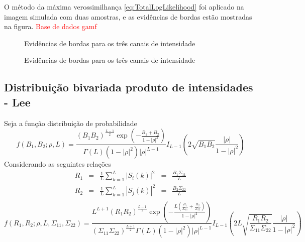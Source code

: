 O método da máxima verossimilhança \eqref{eq:TotalLogLikelihood} foi aplicado na imagem simulada com duas amostras, e as evidências de bordas estão mostradas na figura. \textcolor{red}{Base de dados gamf}
 \begin{figure*}[hbt]
	\centering
    \caption{Evidências de bordas para os três canais de intensidade}
     \label{evidencias_hh_hv_vv_gamf} 
   \end{figure*}
   
   \begin{figure*}[hbt]
	\centering
    \caption{Evidências de bordas para os três canais de intensidade}
     \label{evidencias_hh_hv_vv_gamf} 
   \end{figure*}   
   
   
\subsection{Distribuição bivariada produto de intensidades - Lee } 

Seja a função distribuição de probabilidade 
\begin{equation}\label{func_biv_produto_inten_b1_b2}
	f(B_1,B_2;\rho, L)=\frac{\left(B_1B_2\right)^{\frac{L-1}{2}}\exp\left(-\frac{B_1+B_2}{1-|\rho|^2}\right)}{\Gamma(L)(1-|\rho|^2)|\rho|^{L-1}}I_{L-1}\left(2\sqrt{B_1B_2}\frac{|\rho|}{1-|\rho|^2}\right)
\end{equation}
Considerando as seguintes relações 
\begin{equation}\label{eqn59}
\begin{array}{ccccc}
	R_1&=&\frac{1}{L}\sum_{k=1}^{L}|S_i(k)|^2&=&\frac{B_1\Sigma_{11}}{L}\\
	R_2&=&\frac{1}{L}\sum_{k=1}^{L}|S_j(k)|^2&=&\frac{B_2\Sigma_{22}}{L}\\
\end{array}
\end{equation}
\begin{equation}\label{fun_pdf_biv_inten}
	f(R_1,R_2;\rho,L, \Sigma_{11}, \Sigma_{22})=\frac{L^{L+1}\left(R_1R_2\right)^{\frac{L-1}{2}}\exp\left(-\frac{L\left(\frac{R_1}{\Sigma_{11}}+\frac{R_2}{\Sigma_{22}}\right)}{1-|\rho|^2}\right)}{(\Sigma_{11}\Sigma_{22})^{\frac{L+1}{2}}\Gamma(L)(1-|\rho|^2)|\rho|^{L-1}}I_{L-1}\left(2L\sqrt{\frac{R_1R_2}{\Sigma_{11}\Sigma_{22}}}\frac{|\rho|}{1-|\rho|^2}\right)
\end{equation}

